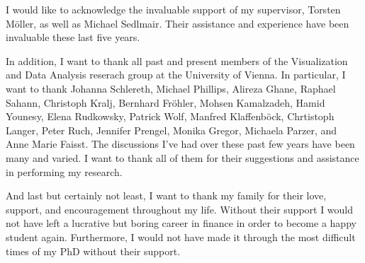 
I would like to acknowledge the invaluable support of my supervisor, Torsten
M{\"o}ller, as well as Michael Sedlmair. Their assistance and experience have
been invaluable these last five years.

In addition, I want to thank all past and present members of the Visualization
and Data Analysis reserach group at the University of Vienna. In particular, I
want to thank Johanna Schlereth, Michael Phillips, Alireza Ghane, Raphael
Sahann, Christoph Kralj, Bernhard Fr{\"o}hler, Mohsen Kamalzadeh, Hamid Younesy,
Elena Rudkowsky, Patrick Wolf, Manfred Klaffenb{\"o}ck, Chrtistoph Langer,
Peter Ruch, Jennifer Prengel, Monika Gregor, Michaela Parzer, and Anne Marie
Faisst. The discussions I've had over these past few years have been many and
varied. I want to thank all of them for their suggestions and assistance in
performing my research.

And last but certainly not least, I want to thank my family for their love,
support, and encouragement throughout my life. Without their support I would
not have left a lucrative but boring career in finance in order to become a
happy student again. Furthermore, I would not have made it through the
most difficult times of my PhD without their support.


